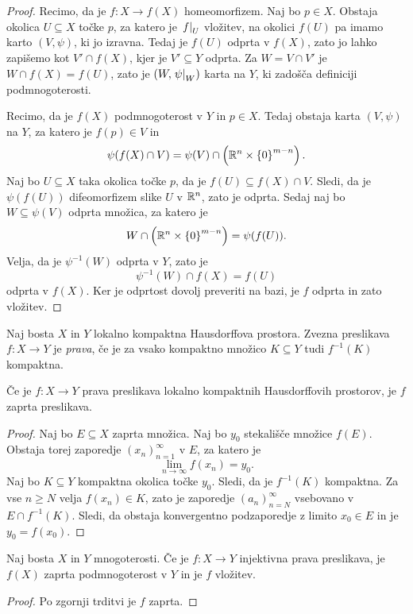 \begin{proof}
Recimo, da je $f \colon X \to f(X)$ homeomorfizem. Naj bo
$p \in X$. Obstaja okolica $U \subseteq X$ točke $p$, za katero je
$\left. f\right|_{U}^{}$ vložitev, na okolici $f(U)$ pa imamo karto
$(V, \psi)$, ki jo izravna. Tedaj je $f(U)$ odprta v $f(X)$, zato
jo lahko zapišemo kot $V' \cap f(X)$, kjer je $V' \subseteq Y$
odprta. Za $W = V \cap V'$ je $W \cap f(X) = f(U)$, zato je
$(W, \left. \psi\right|_{W}^{})$ karta na $Y$, ki zadošča definiciji
podmnogoterosti.

Recimo, da je $f(X)$ podmnogoterost v $Y$ in $p \in X$. Tedaj
obstaja karta $(V, \psi)$ na $Y$, za katero je $f(p) \in V$ in
\[
\psi(f(X) \cap V) = \psi(V) \cap \left(\mathbb{R}^n \times \left\{0\right\}^{m-n}\right).
\]
Naj bo $U \subseteq X$ taka okolica točke $p$, da je
$f(U) \subseteq f(X) \cap V$. Sledi, da je $\psi(f(U))$
difeomorfizem slike $U$ v $\mathbb{R}^n$, zato je odprta. Sedaj naj bo
$W \subseteq \psi(V)$ odprta množica, za katero je
\[
W \cap \left(\mathbb{R}^n \times \left\{0\right\}^{m-n}\right) = \psi(f(U)).
\]
Velja, da je $\psi^{-1}(W)$ odprta v $Y$, zato je
\[
\psi^{-1}(W) \cap f(X) = f(U)
\]
odprta v $f(X)$. Ker je odprtost dovolj preveriti na bazi, je $f$
odprta in zato vložitev.
\end{proof}

\begin{definicija}
Naj bosta $X$ in $Y$ lokalno kompaktna Hausdorffova prostora.
Zvezna preslikava $f \colon X \to Y$ je
\emph{prava}, če je za vsako kompaktno
množico $K \subseteq Y$ tudi $f^{-1}(K)$ kompaktna.
\end{definicija}

\begin{trditev}
Če je $f \colon X \to Y$ prava preslikava lokalno kompaktnih
Hausdorffovih prostorov, je $f$ zaprta preslikava.
\end{trditev}

\begin{proof}
Naj bo $E \subseteq X$ zaprta množica. Naj bo $y_0$ stekališče
množice $f(E)$. Obstaja torej zaporedje $(x_n)_{n=1}^\infty$ v $E$,
za katero je
\[
\lim_{n \to \infty} f(x_n) = y_0.
\]
Naj bo $K \subseteq Y$ kompaktna okolica točke $y_0$. Sledi, da je
$f^{-1}(K)$ kompaktna. Za vse $n \geq N$ velja $f(x_n) \in K$, zato
je zaporedje $(a_n)_{n=N}^\infty$ vsebovano v $E \cap f^{-1}(K)$.
Sledi, da obstaja konvergentno podzaporedje z limito $x_0 \in E$ in
je $y_0 = f(x_0)$.
\end{proof}

\begin{posledica}
Naj bosta $X$ in $Y$ mnogoterosti. Če je $f \colon X \to Y$
injektivna prava preslikava, je $f(X)$ zaprta podmnogoterost v $Y$
in je $f$ vložitev.
\end{posledica}

\begin{proof}
Po zgornji trditvi je $f$ zaprta.
\end{proof}
